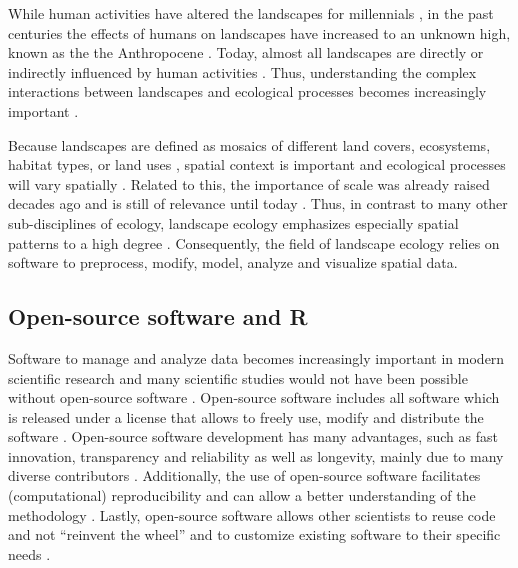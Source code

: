 \documentclass[smallextended]{svjour3}       %
\begin{document}
While human activities have altered the landscapes for millennials
\cite{Ellis2011,Ellis2015}, in the past centuries the effects of humans
on landscapes have increased to an unknown high, known as the the
Anthropocene \cite{Crutzen2002}. Today, almost all landscapes are
directly or indirectly influenced by human activities
\cite{Vitousek1997}. Thus, understanding the complex interactions
between landscapes and ecological processes becomes increasingly
important \cite{With2019}.

Because landscapes are defined as mosaics of different land covers,
ecosystems, habitat types, or land uses
\cite{Forman1986,Forman1995,Wiens1995}, spatial context is important and
ecological processes will vary spatially \cite{With2019}. Related to
this, the importance of scale was already raised decades ago
\cite{Wiens1989,Levin1992,Jelinski1996} and is still of relevance until
today \cite{Simova2012,Estes2018}. Thus, in contrast to many other
sub-disciplines of ecology, landscape ecology emphasizes especially
spatial patterns to a high degree \cite{Risser1984}. Consequently, the
field of landscape ecology relies on software to preprocess, modify,
model, analyze and visualize spatial data.

\hypertarget{sec:open_source}{%
\subsection{Open-source software and R}\label{sec:open_source}}

Software to manage and analyze data becomes increasingly important in
modern scientific research \cite{Wilson2014} and many scientific studies
would not have been possible without open-source software
\cite{Prlic2012}. Open-source software includes all software which is
released under a license that allows to freely use, modify and
distribute the software \cite{St.Laurent2008}. Open-source software
development has many advantages, such as fast innovation, transparency
and reliability as well as longevity, mainly due to many diverse
contributors \cite{vonKrogh2006,St.Laurent2008}. Additionally, the use
of open-source software facilitates (computational) reproducibility and
can allow a better understanding of the methodology
\cite{Prlic2012,Powers2019}. Lastly, open-source software allows other
scientists to reuse code and not ``reinvent the wheel'' \cite{Prlic2012}
and to customize existing software to their specific needs
\cite{Steiniger2009}.
\end{document}
